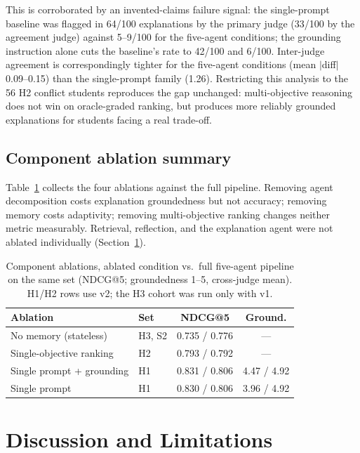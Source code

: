 \documentclass[conference]{IEEEtran}
\begin{document}
This is corroborated by an invented-claims failure signal: the single-prompt baseline was
flagged in 64/100 explanations by the primary judge (33/100 by the agreement judge)
against 5--9/100 for the five-agent conditions; the grounding instruction alone cuts the
baseline's rate to 42/100 and 6/100. Inter-judge agreement is correspondingly tighter for
the five-agent conditions (mean $|$diff$|$ 0.09--0.15) than the single-prompt family
(1.26). Restricting this analysis to the 56 H2 conflict students reproduces the gap
unchanged: multi-objective reasoning does not win on oracle-graded ranking, but produces
more reliably grounded explanations for students facing a real trade-off.

\subsection{Component ablation summary}

Table~\ref{tab:ablation} collects the four ablations against the full pipeline. Removing
agent decomposition costs explanation groundedness but not accuracy; removing memory costs
adaptivity; removing multi-objective ranking changes neither metric measurably.
Retrieval, reflection, and the explanation agent were not ablated individually
(Section~\ref{sec:discussion}).

\begin{table}[t]
\caption{Component ablations, ablated condition vs.\ full five-agent pipeline on the
same set (NDCG@5; groundedness 1--5, cross-judge mean). H1/H2 rows use v2; the H3
cohort was run only with v1.}
\label{tab:ablation}
\centering
\begin{tabular}{@{}p{2.9cm}lcc@{}}
\toprule
\textbf{Ablation} & \textbf{Set} & \textbf{NDCG@5} & \textbf{Ground.} \\
\midrule
No memory (stateless) & H3, S2 & 0.735 / 0.776 & --- \\
Single-objective ranking & H2 & 0.793 / 0.792 & --- \\
Single prompt + grounding & H1 & 0.831 / 0.806 & 4.47 / 4.92 \\
Single prompt & H1 & 0.830 / 0.806 & 3.96 / 4.92 \\
\bottomrule
\end{tabular}
\end{table}

\section{Discussion and Limitations}
\label{sec:discussion}
\end{document}
